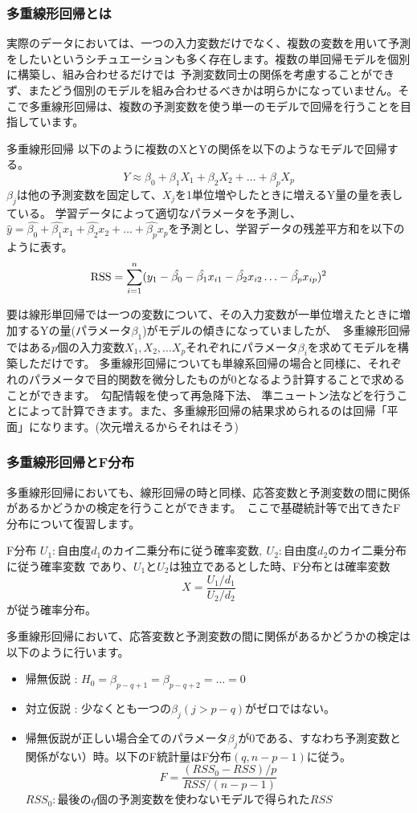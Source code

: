 \documentclass[uplatex]{jsarticle}
\begin{document}
\subsubsection{多重線形回帰とは}
実際のデータにおいては、一つの入力変数だけでなく、複数の変数を用いて予測をしたいというシチュエーションも多く存在します。複数の単回帰モデルを個別に構築し、組み合わせるだけでは\
予測変数同士の関係を考慮することができず、またどう個別のモデルを組み合わせるべきかは明らかになっていません。そこで多重線形回帰は、複数の予測変数を使う単一のモデルで回帰を行うことを目指しています。
\begin{itembox}[l]{多重線形回帰}
  以下のように複数のXとYの関係を以下のようなモデルで回帰する。
    $$Y \approx \beta_0 + \beta_1X_1 + \beta_2X_2 + \ldots + \beta_pX_p$$
    $\beta_j$は他の予測変数を固定して、$X_j$を1単位増やしたときに増えるY量の量を表している。
    学習データによって適切なパラメータを予測し、$\hat{y} = \hat{\beta_0} + \hat{\beta_1}x_1 + \hat{\beta_2}x_2 + \dots + \hat{\beta_p}x_p$を予測とし、学習データの残差平方和を以下のように表す。
    $${\rm RSS} = \sum_{i=1}^n (y_1 - \hat{\beta_0} - \hat{\beta_1}x_{i1} - \hat{\beta_2}x_{i2} \ldots - \hat{\beta_p}x_{ip})^2 $$
\end{itembox}
要は線形単回帰では一つの変数について、その入力変数が一単位増えたときに増加するYの量(パラメータ$\beta_1$)がモデルの傾きになっていましたが、\
多重線形回帰ではある$p$個の入力変数$X_1, X_2, \ldots X_p$それぞれにパラメータ$\beta_i$を求めてモデルを構築しただけです。
多重線形回帰についても単線系回帰の場合と同様に、それぞれのパラメータで目的関数を微分したものが0となるよう計算することで求めることができます。\
勾配情報を使って再急降下法、 準ニュートン法などを行うことによって計算できます。また、多重線形回帰の結果求められるのは回帰「平面」になります。(次元増えるからそれはそう)

\subsubsection{多重線形回帰とF分布}
多重線形回帰においても、線形回帰の時と同様、応答変数と予測変数の間に関係があるかどうかの検定を行うことができます。\
ここで基礎統計等で出てきたF分布について復習します。\
\begin{itembox}[l]{F分布}
  $U_1 : 自由度d_1のカイ二乗分布に従う確率変数,\ U_2 : 自由度d_2$のカイ二乗分布に従う確率変数
  であり、$U_1とU_2$は独立であるとした時、F分布とは確率変数
  $$X = \frac{U_1/d_1}{U_2/d_2}$$が従う確率分布。
\end{itembox}
多重線形回帰において、応答変数と予測変数の間に関係があるかどうかの検定は以下のように行います。
\begin{itemize}
  \item 帰無仮説 : $H_0 = \beta_{p-q+1} = \beta_{p-q+2} = \dots = 0$
  \item 対立仮説 : 少なくとも一つの$\beta_j(j>p-q)$がゼロではない。
  \item 帰無仮説が正しい場合全てのパラメータ$\beta_j$が0である、すなわち予測変数と関係がない）時。以下のF統計量はF分布$(q,n-p-1)$に従う。
  $$F = \frac{(RSS_0 - RSS)/p}{RSS/(n-p-1)}$$
  $RSS_0 : 最後のq個の予測変数を使わないモデルで得られたRSS$
\end{itemize}
\end{document}
